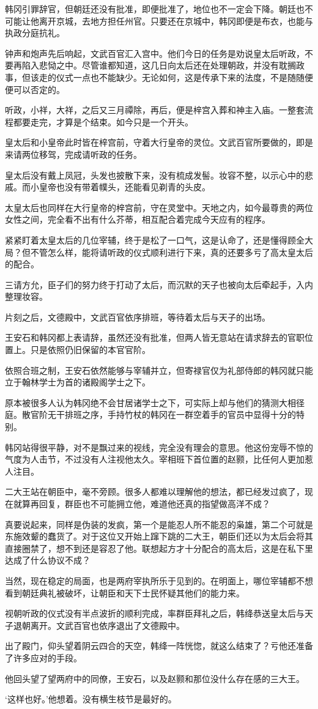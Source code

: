 韩冈引罪辞官，但朝廷还没有批准，即便批准了，地位也不一定会下降。朝廷也不可能让他离开京城，去地方担任州官。只要还在京城中，韩冈即便是布衣，也能与执政分庭抗礼。

钟声和炮声先后响起，文武百官汇入宫中。他们今日的任务是劝说皇太后听政，不要再陷入悲恸之中。尽管谁都知道，这几日向太后还在处理朝政，并没有耽搁政事，但该走的仪式一点也不能缺少。无论如何，这是传承下来的法度，不是随随便便可以否定的。

听政，小祥，大祥，之后又三月禫除，再后，便是梓宫入葬和神主入庙。一整套流程都要走完，才算是个结束。如今只是一个开头。

皇太后和小皇帝此时皆在梓宫前，守着大行皇帝的灵位。文武百官所要做的，即是来请两位移驾，完成请听政的任务。

皇太后没有戴上凤冠，头发也披散下来，没有梳成发髻。妆容不整，以示心中的悲戚。而小皇帝也没有带着幞头，还能看见剃青的头皮。

太皇太后也同样在大行皇帝的梓宫前，守在灵堂中。天地之内，如今最尊贵的两位女性之间，完全看不出有什么芥蒂，相互配合着完成今天应有的程序。

紧紧盯着太皇太后的几位宰辅，终于是松了一口气，这是认命了，还是懂得顾全大局？但不管怎么样，能将请听政的仪式顺利进行下来，真的还要多亏了高太皇太后的配合。

三请方允，臣子们的努力终于打动了太后，而沉默的天子也被向太后牵起手，入内整理妆容。

片刻之后，文德殿中，文武百官依序排班，等待着太后与天子的出场。

王安石和韩冈都上表请辞，虽然还没有批准，但两人皆无意站在请求辞去的官职位置上。只是依照仍旧保留的本官官阶。

依照合班之制，王安石依然能够与宰辅并立，但寄禄官仅为礼部侍郎的韩冈就只能立于翰林学士为首的诸殿阁学士之下。

原本被很多人认为韩冈绝不会甘居诸学士之下，可实际上却与他们的猜测大相径庭。散官阶无干排班之序，手持竹杖的韩冈在一群空着手的官员中显得十分的特别。

韩冈站得很平静，对不是飘过来的视线，完全没有理会的意思。他这份宠辱不惊的气度为人击节，不过没有人注视他太久。宰相班下首位置的赵颢，比任何人更加惹人注目。

二大王站在朝臣中，毫不旁顾。很多人都难以理解他的想法，都已经发过疯了，现在就算再回复，群臣也不可能拥立他，难道他还真的指望做高洋不成？

真要说起来，同样是伪装的发疯，第一个是能忍人所不能忍的枭雄，第二个可就是东施效颦的蠢货了。对于这位又开始上蹿下跳的二大王，朝臣们还以为太后会将其直接圈禁了，想不到还是容忍了他。联想起方才十分配合的高太后，这是在私下里达成了什么协议不成？

当然，现在稳定的局面，也是两府宰执所乐于见到的。在明面上，哪位宰辅都不想看到朝廷典礼被破坏，让朝臣和天下士民怀疑其他们的能力来。

视朝听政的仪式没有半点波折的顺利完成，率群臣拜礼之后，韩绛恭送皇太后与天子退朝离开。文武百官也依序退出了文德殿中。

出了殿门，仰头望着阴云四合的天空，韩绛一阵恍惚，就这么结束了？亏他还准备了许多应对的手段。

他回头望了望两府中的同僚，王安石，以及赵颢和那位没什么存在感的三大王。

‘这样也好。’他想着。没有横生枝节是最好的。

